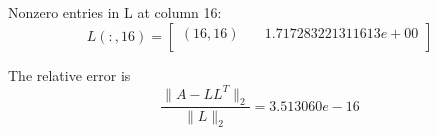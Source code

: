 \begin{enumerate}
Nonzero entries in L at column 16:
$$
L(:,16) = 
\begin{bmatrix}
(16,16)  & \quad       1.717283221311613e+00\\
\end{bmatrix}
$$


The relative error is
$$
\frac{\parallel A- LL^{T}\parallel_{2}}{\parallel L \parallel_{2}} = 3.513060e-16
$$
\end{enumerate}